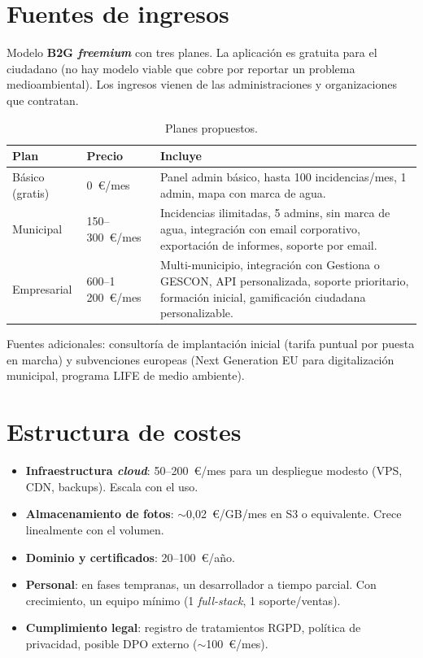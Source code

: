 \section*{Fuentes de ingresos}

Modelo \textbf{B2G \textit{freemium}} con tres planes. La aplicación es gratuita para el ciudadano (no hay modelo viable que cobre por reportar un problema medioambiental). Los ingresos vienen de las administraciones y organizaciones que contratan.

\begin{table}[H]
\centering
\caption{Planes propuestos.}
\label{tab:planes}
\small
\begin{tabular}{@{}L{2.5cm}L{3cm}L{7.5cm}@{}}
\toprule
\textbf{Plan} & \textbf{Precio} & \textbf{Incluye} \\
\midrule
Básico (gratis) & 0~€/mes & Panel admin básico, hasta 100 incidencias/mes, 1 admin, mapa con marca de agua. \\
Municipal & 150--300~€/mes & Incidencias ilimitadas, 5 admins, sin marca de agua, integración con email corporativo, exportación de informes, soporte por email. \\
Empresarial & 600--1\,200~€/mes & Multi-municipio, integración con Gestiona o GESCON, API personalizada, soporte prioritario, formación inicial, gamificación ciudadana personalizable. \\
\bottomrule
\end{tabular}
\end{table}

Fuentes adicionales: consultoría de implantación inicial (tarifa puntual por puesta en marcha) y subvenciones europeas (Next Generation EU para digitalización municipal, programa LIFE de medio ambiente).


\section*{Estructura de costes}

\begin{itemize}[leftmargin=1.2cm, itemsep=2pt]
  \item \textbf{Infraestructura \textit{cloud}}: 50--200~€/mes para un despliegue modesto (VPS, CDN, backups). Escala con el uso.
  \item \textbf{Almacenamiento de fotos}: $\sim$0,02~€/GB/mes en S3 o equivalente. Crece linealmente con el volumen.
  \item \textbf{Dominio y certificados}: 20--100~€/año.
  \item \textbf{Personal}: en fases tempranas, un desarrollador a tiempo parcial. Con crecimiento, un equipo mínimo (1 \textit{full-stack}, 1 soporte/ventas).
  \item \textbf{Cumplimiento legal}: registro de tratamientos RGPD, política de privacidad, posible DPO externo ($\sim$100~€/mes).
\end{itemize}


